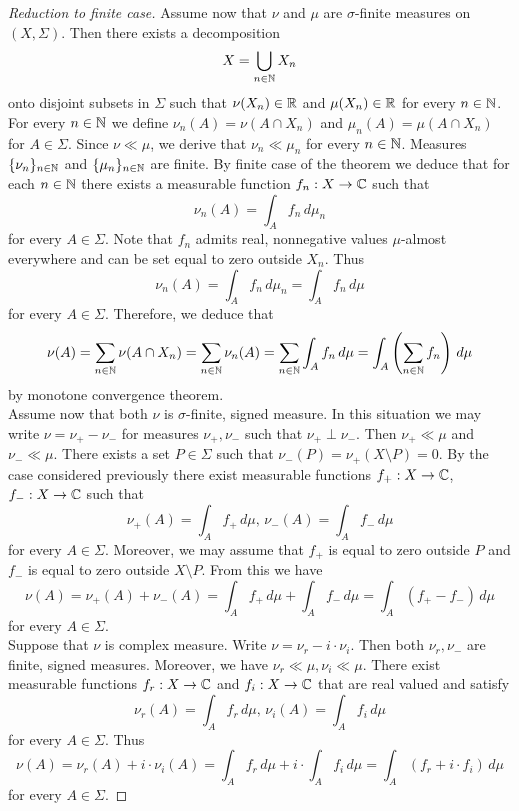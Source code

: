 \begin{proof}[Reduction to finite case]
Assume now that $\nu$ and $\mu$ are $\sigma$-finite measures on $(X,\Sigma)$. Then there exists a decomposition
$$X= \bigcup_{n\in {\mathbb N}}X_n$$
onto disjoint subsets in $\Sigma$ such that $\nu(X_n)\in {\mathbb R}$ and $\mu(X_n)\in {\mathbb R}$ for every $n\in {\mathbb N}$. For every $n\in {\mathbb N}$ we define $\nu_n(A) = \nu(A\cap X_n)$ and $\mu_n(A) = \mu(A\cap X_n)$ for $A\in \Sigma$. Since $\nu \ll \mu$, we derive that $\nu_n\ll \mu_n$ for every $n\in {\mathbb N}$. Measures $\{\nu_n\}_{n\in {\mathbb N}}$ and $\{\mu_n\}_{n\in {\mathbb N}}$ are finite. By finite case of the theorem we deduce that for each $n\in {\mathbb N}$ there exists a measurable function $f_n:X\rightarrow {\mathbb C}$ such that
$$\nu_n(A) = \int_A f_n\,d\mu_n$$
for every $A\in \Sigma$. Note that $f_n$ admits real, nonnegative values $\mu$-almost everywhere and can be set equal to zero outside $X_n$. Thus
$$\nu_n(A) = \int_A f_n\,d\mu_n = \int_A f_n\,d\mu$$
for every $A\in \Sigma$. Therefore, we deduce that
$$\nu(A) = \sum_{n\in {\mathbb N}}\nu(A\cap X_n) = \sum_{n\in {\mathbb N}}\nu_n(A) =\sum_{n\in {\mathbb N}}\int_Af_n\,d\mu = \int_A \left(\sum_{n\in {\mathbb N}}f_n\right)\,d\mu$$
by monotone convergence theorem.\\
Assume now that both $ \nu$ is $\sigma$-finite, signed measure. In this situation we may write $\nu = \nu_+-\nu_-$ for measures $\nu_+, \nu_-$ such that $\nu_+\perp \nu_-$. Then $\nu_+ \ll \mu$ and $\nu_-\ll \mu$.  There exists a set $P\in \Sigma$ such that $\nu_-(P)=\nu_+(X\setminus P)=0$. By the case considered previously there exist measurable functions $f_+:X\rightarrow {\mathbb C}$, $f_-:X\rightarrow {\mathbb C}$ such that
$$\nu_+(A) = \int_Af_+\,d\mu,\,\nu_-(A) = \int_Af_-\,d\mu$$
for every $A\in \Sigma$. Moreover, we may assume that $f_+$ is equal to zero outside $P$ and $f_-$ is equal to zero outside $X\setminus P$. From this we have
$$\nu(A) = \nu_+(A) + \nu_-(A) = \int_Af_+\,d\mu + \int_Af_-\,d\mu = \int_A\left(f_+-f_-\right)\,d\mu $$
for every $A\in \Sigma$.\\
Suppose that $\nu$ is complex measure. Write $\nu = \nu_r - i\cdot \nu_i$. Then both $\nu_r, \nu_-$ are finite, signed measures. Moreover, we have $\nu_r\ll\mu,\nu_i\ll \mu$. There exist measurable functions $f_r:X\rightarrow {\mathbb C}$ and $f_i:X\rightarrow {\mathbb C}$ that are real valued and satisfy
$$\nu_r(A) = \int_Af_r\,d\mu,\,\nu_i(A) = \int_Af_i\,d\mu$$
for every $A\in \Sigma$. Thus
$$\nu(A) = \nu_r(A) + i\cdot \nu_i(A) = \int_Af_r\,d\mu + i\cdot \int_Af_i\,d\mu = \int_A\left(f_r+i\cdot f_i\right)\,d\mu$$
for every $A\in \Sigma$.
\end{proof}

